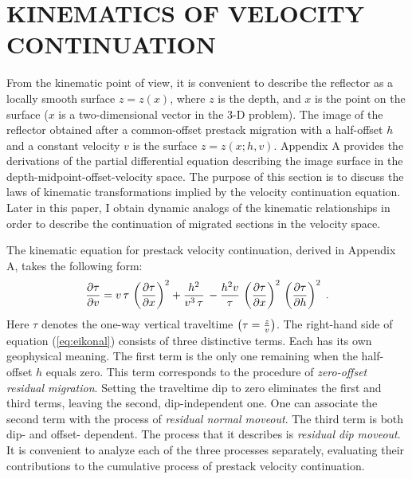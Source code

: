 \begin{comment}
It is important to note that although the velocity continuation result
could be achieved in principle by using prestack residual migration in
Kirchhoff \cite[]{Etgen.sepphd.68} or Stolt \cite[]{GEO61-02-06050607}
formulation, the first is evidently inferior in efficiency, and the
second is not convenient for velocity analysis across different
offsets, because it mixes them in the Fourier domain.
\end{comment}

\section{KINEMATICS OF VELOCITY CONTINUATION}

From the kinematic point of view, it is convenient to describe the
reflector as a locally smooth surface $z = z(x)$, where $z$ is the
depth, and $x$ is the point on the surface ($x$ is a two-dimensional
vector in the 3-D problem). The image of the reflector obtained after
a common-offset prestack migration with a half-offset $h$ and a
constant velocity $v$ is the surface $z = z(x;h,v)$. Appendix A
provides the derivations of the partial differential equation
describing the image surface in the depth-midpoint-offset-velocity
space. The purpose of this section is to discuss the laws of kinematic
transformations implied by the velocity continuation equation. Later
in this paper, I obtain dynamic analogs of the kinematic
relationships in order to describe the continuation of migrated
sections in the velocity space.

The kinematic equation for prestack velocity continuation, derived in
Appendix A, takes the following form:
\begin{equation}
{{\partial \tau} \over {\partial v}} = 
v\,\tau\,\left({{\partial \tau} \over {\partial x}}\right)^2 +
{{h^2} \over {v^3\,\tau}}\,- 
\frac{h^2 v}{\tau}\,
\left({{\partial \tau} \over {\partial x}}\right)^2\,
\left({{\partial \tau} \over {\partial h}}\right)^2\;.
\label{eq:eikonal} 
\end{equation}
Here $\tau$ denotes the one-way vertical traveltime $\left(\tau = {z
\over v}\right)$. The right-hand side of equation (\ref{eq:eikonal})
consists of three distinctive terms. Each has its own geophysical meaning. The first term is the only one remaining
when the half-offset $h$ equals zero. This term corresponds to the procedure of
{\em zero-offset residual migration}.  Setting the traveltime dip to
zero eliminates the first and third terms, leaving the second,
dip-independent one. One can associate the second term with the process of
{\em residual normal moveout}. The third term is both dip- and offset-
dependent. The process that it describes is {\em residual dip
moveout}. It is convenient to analyze each of the three processes
separately, evaluating their contributions to the cumulative process
of prestack velocity continuation.

